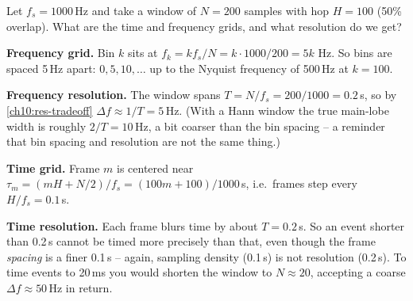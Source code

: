 \begin{example}
\label{ch10:ex-numbers}
Let $f_s = 1000$\,Hz and take a window of $N = 200$ samples with hop $H = 100$
(50\% overlap). What are the time and frequency grids, and what resolution do we
get?

\textbf{Frequency grid.} Bin $k$ sits at $f_k = k f_s/N = k\cdot 1000/200 = 5k$
Hz. So bins are spaced 5\,Hz apart: $0, 5, 10, \dots$ up to the Nyquist frequency
of 500\,Hz at $k = 100$.

\textbf{Frequency resolution.} The window spans $T = N/f_s = 200/1000 = 0.2$\,s,
so by \eqref{ch10:res-tradeoff} $\Delta f \approx 1/T = 5$\,Hz. (With a Hann
window the true main-lobe width is roughly $2/T = 10$\,Hz, a bit coarser than the
bin spacing -- a reminder that bin spacing and resolution are not the same thing.)

\textbf{Time grid.} Frame $m$ is centered near $\tau_m = (mH + N/2)/f_s
= (100m + 100)/1000$\,s, i.e.\ frames step every $H/f_s = 0.1$\,s.

\textbf{Time resolution.} Each frame blurs time by about $T = 0.2$\,s. So an event
shorter than 0.2\,s cannot be timed more precisely than that, even though the
frame \emph{spacing} is a finer 0.1\,s -- again, sampling density (0.1\,s) is not
resolution (0.2\,s). To time events to 20\,ms you would shorten the window to
$N \approx 20$, accepting a coarse $\Delta f \approx 50$\,Hz in return.
\end{example}

